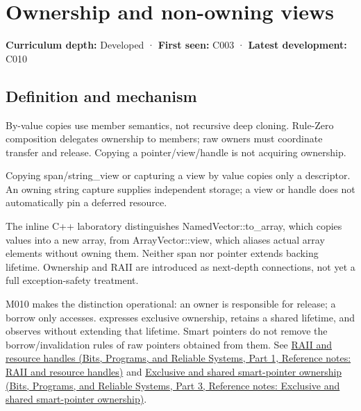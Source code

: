 \hypertarget{appendix-d52e4486f527}{}\label{referencestart:appendix-d52e4486f527}
\section{Ownership and non-owning views}\label{appendix-d52e4486f527-ownership-and-non-owning-views}

\hypertarget{appendix-d52e4486f527-ownership-and-non-owning-views}{}

\textbf{Curriculum depth:} Developed · \textbf{First seen:} C003 · \textbf{Latest development:} C010

\begin{allmightroledefinition}

\subsection{Definition and mechanism}\label{appendix-d52e4486f527-definition-and-mechanism}

\hypertarget{appendix-d52e4486f527-definition-and-mechanism}{}

By-value copies use member semantics, not recursive deep cloning. Rule-Zero composition delegates ownership to members; raw owners must coordinate transfer and release. Copying a pointer/view/handle is not acquiring ownership.

\end{allmightroledefinition}

Copying span/string\_view or capturing a view by value copies only a descriptor. An owning string capture supplies independent storage; a view or handle does not automatically pin a deferred resource.

The inline C++ laboratory distinguishes NamedVector::to\_array, which copies values into a new array, from ArrayVector::view, which aliases actual array elements without owning them. Neither span nor pointer extends backing lifetime. Ownership and RAII are introduced as next-depth connections, not yet a full exception-safety treatment.

M010 makes the distinction operational: an owner is responsible for release; a borrow only accesses.  expresses exclusive ownership,  retains a shared lifetime, and  observes without extending that lifetime. Smart pointers do not remove the borrow/invalidation rules of raw pointers obtained from them. See \href{../01-Bits-Programs-and-Reliable-Systems-P01/main.pdf\#nameddest=appendix-69739d3ab49b}{RAII and resource handles (Bits, Programs, and Reliable Systems, Part 1, Reference notes: RAII and resource handles)} and \href{../01-Bits-Programs-and-Reliable-Systems-P03/main.pdf\#nameddest=appendix-51602cabe815}{Exclusive and shared smart-pointer ownership (Bits, Programs, and Reliable Systems, Part 3, Reference notes: Exclusive and shared smart-pointer ownership)}.

